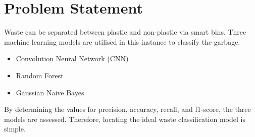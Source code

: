 \section{Problem Statement}
\par Waste can be separated between plastic and non-plastic via smart bins. Three machine learning models are utilised in this instance to classify the garbage.
\begin{itemize}
    \item Convolution Neural Network (CNN)
    \item Random Forest
    \item Gaussian Naive Bayes
\end{itemize}
\par By determining the values for precision, accuracy, recall, and f1-score, the three models are assessed. Therefore, locating the ideal waste classification model is simple.














































































